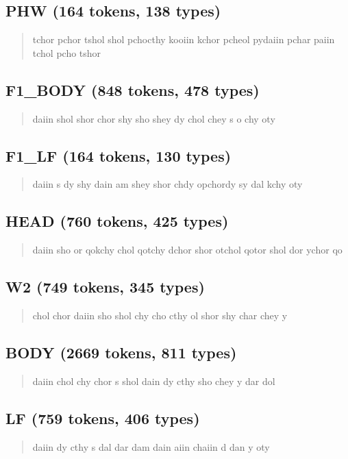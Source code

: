\documentclass[11pt,a4paper]{article}
\begin{document}
\subsection*{PHW (164 tokens, 138 types)}
\begin{quote}\ttfamily\small\sloppy tchor  pchor  tshol  shol  pchocthy  kooiin  kchor  pcheol  pydaiin  pchar  paiin  tchol  pcho  tshor\end{quote}
\subsection*{F1\_BODY (848 tokens, 478 types)}
\begin{quote}\ttfamily\small\sloppy daiin  shol  shor  chor  shy  sho  shey  dy  chol  chey  s  o  chy  oty\end{quote}
\subsection*{F1\_LF (164 tokens, 130 types)}
\begin{quote}\ttfamily\small\sloppy daiin  s  dy  shy  dain  am  shey  shor  chdy  opchordy  sy  dal  kchy  oty\end{quote}
\subsection*{HEAD (760 tokens, 425 types)}
\begin{quote}\ttfamily\small\sloppy daiin  sho  or  qokchy  chol  qotchy  dchor  shor  otchol  qotor  shol  dor  ychor  qo\end{quote}
\subsection*{W2 (749 tokens, 345 types)}
\begin{quote}\ttfamily\small\sloppy chol  chor  daiin  sho  shol  chy  cho  cthy  ol  shor  shy  char  chey  y\end{quote}
\subsection*{BODY (2669 tokens, 811 types)}
\begin{quote}\ttfamily\small\sloppy daiin  chol  chy  chor  s  shol  dain  dy  cthy  sho  chey  y  dar  dol\end{quote}
\subsection*{LF (759 tokens, 406 types)}
\begin{quote}\ttfamily\small\sloppy daiin  dy  cthy  s  dal  dar  dam  dain  aiin  chaiin  d  dan  y  oty\end{quote}
\end{document}
